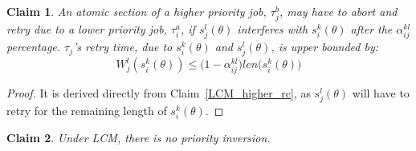 \documentclass[a4paper,english]{article}
\newtheorem{clm}{Claim}
\newtheorem{proof}{Proof}
\begin{document}
\begin{clm}
\label{LCM_lower_rc}
An atomic section of a higher priority job, $\tau_{j}^b$, may have to abort and retry due to a lower priority job, $\tau_{i}^a$, if $s_{j}^{l}(\theta)$ interferes
with $s_{i}^{k}(\theta)$ after the $\alpha_{ij}^{kl}$ percentage. $\tau_{j}$'s retry time, due to $s_{i}^{k}(\theta)$ and $s_{j}^{l}(\theta)$,
is upper bounded by:
 \begin{equation}
W_j^l(s_i^k(\theta))\le \Big(1-\alpha_{ij}^{kl}\Big)len\Big(s_{i}^{k}(\theta)\Big)\label{eq48}\end{equation}
\end{clm}

\begin{proof}\normalfont
It is derived directly from Claim~\ref{LCM_higher_rc}, as $s_j^l(\theta)$ will have to retry for the remaining length of $s_i^k(\theta)$.
\end{proof}

\begin{clm}
\label{no priority inversion in lcm}
Under LCM, there is no priority inversion.
\end{clm}
\end{document}
